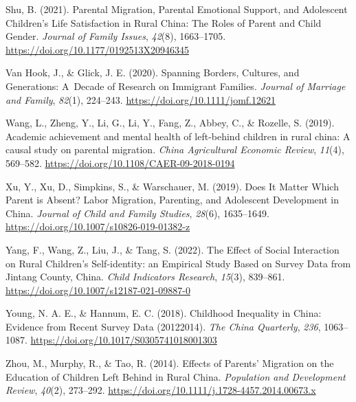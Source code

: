 \documentclass[
  man]{apa7}
\newlength{\cslhangindent}
\newlength{\cslentryspacingunit} %
\newenvironment{CSLReferences}[2] %
 {%
  \setlength{\parindent}{0pt}
  \ifodd #1
  \let\oldpar\par
  \def\par{\hangindent=\cslhangindent\oldpar}
  \fi
  \setlength{\parskip}{#2\cslentryspacingunit}
 }%
 {}
\begin{document}
\begin{CSLReferences}{1}{0}
\leavevmode{}%
Shu, B. (2021). Parental Migration, Parental Emotional Support, and Adolescent Children{'}s Life Satisfaction in Rural China: The Roles of Parent and Child Gender. \emph{Journal of Family Issues}, \emph{42}(8), 1663--1705. \url{https://doi.org/10.1177/0192513X20946345}

\leavevmode{}%
Van Hook, J., \& Glick, J. E. (2020). Spanning Borders, Cultures, and Generations: A~Decade of Research on Immigrant Families. \emph{Journal of Marriage and Family}, \emph{82}(1), 224--243. \url{https://doi.org/10.1111/jomf.12621}

\leavevmode{}%
Wang, L., Zheng, Y., Li, G., Li, Y., Fang, Z., Abbey, C., \& Rozelle, S. (2019). Academic achievement and mental health of left-behind children in rural china: A causal study on parental migration. \emph{China Agricultural Economic Review}, \emph{11}(4), 569--582. \url{https://doi.org/10.1108/CAER-09-2018-0194}

\leavevmode{}%
Xu, Y., Xu, D., Simpkins, S., \& Warschauer, M. (2019). Does It Matter Which Parent is Absent? Labor Migration, Parenting, and Adolescent Development in China. \emph{Journal of Child and Family Studies}, \emph{28}(6), 1635--1649. \url{https://doi.org/10.1007/s10826-019-01382-z}

\leavevmode{}%
Yang, F., Wang, Z., Liu, J., \& Tang, S. (2022). The Effect of Social Interaction on Rural Children{'}s Self-identity: an Empirical Study Based on Survey Data from Jintang County, China. \emph{Child Indicators Research}, \emph{15}(3), 839--861. \url{https://doi.org/10.1007/s12187-021-09887-0}

\leavevmode{}%
Young, N. A. E., \& Hannum, E. C. (2018). Childhood Inequality in China: Evidence from Recent Survey Data (2012{\textendash}2014). \emph{The China Quarterly}, \emph{236}, 1063--1087. \url{https://doi.org/10.1017/S0305741018001303}

\leavevmode{}%
Zhou, M., Murphy, R., \& Tao, R. (2014). Effects of Parents' Migration on the Education of Children Left Behind in Rural China. \emph{Population and Development Review}, \emph{40}(2), 273--292. \url{https://doi.org/10.1111/j.1728-4457.2014.00673.x}

\end{CSLReferences}
\end{document}
